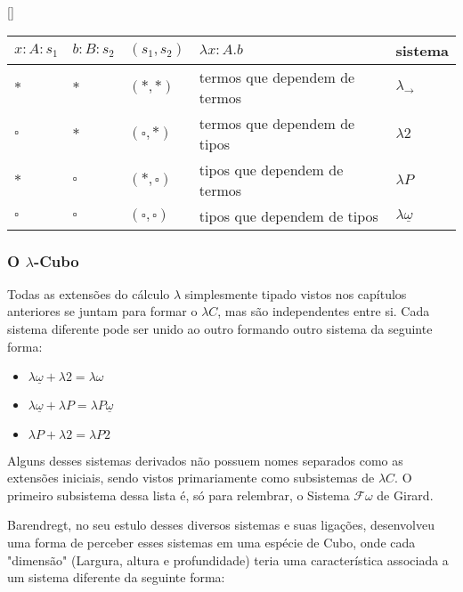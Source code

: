 \documentclass[../main.tex]{subfiles}
\begin{document}
\begin{center}[]
    \begin{tabular}{|l|l|l|l|l|}
    \hline
    $x : A : s_1$ & $b : B : s_2$ & $(s_1, s_2)$         & $\lambda x : A . b$           & sistema                        \\ \hline
    $\ast$        & $\ast$        & $(\ast, \ast)$       & termos que dependem de termos & $\lambda_{\to}$               \\ \hline
    $\square$     & $\ast$        & $(\square, \ast)$    & termos que dependem de tipos  & $\lambda 2$                   \\ \hline
    $\ast$        & $\square$     & $(\ast, \square)$    & tipos que dependem de termos  & $\lambda P$                   \\ \hline
    $\square$     & $\square$     & $(\square, \square)$ & tipos que dependem de tipos   & $\lambda \underline{\omega}$ \\ \hline
    \end{tabular}
\end{center}

\subsubsection{O \texorpdfstring{$\lambda$}{L}-Cubo}

Todas as extensões do cálculo $\lambda$ simplesmente tipado vistos nos capítulos anteriores se juntam para formar o $\lambda C$, mas são independentes entre si. Cada sistema diferente pode ser unido ao outro formando outro sistema da seguinte forma:

\begin{itemize}
    \item $\lambda \underline{\omega} + \lambda 2 = \lambda \omega$
    \item $\lambda \underline{\omega} + \lambda P = \lambda P \underline{\omega}$
    \item $\lambda P + \lambda 2 = \lambda P 2$
\end{itemize}

Alguns desses sistemas derivados não possuem nomes separados como as extensões iniciais, sendo vistos primariamente como subsistemas de $\lambda C$. O primeiro subsistema dessa lista é, só para relembrar, o Sistema $\mathcal{F} \omega$ de Girard.

Barendregt, no seu estulo desses diversos sistemas e suas ligações, desenvolveu uma forma de perceber esses sistemas em uma espécie de Cubo, onde cada "dimensão" (Largura, altura e profundidade) teria uma característica associada a um sistema diferente da seguinte forma:
\end{document}
